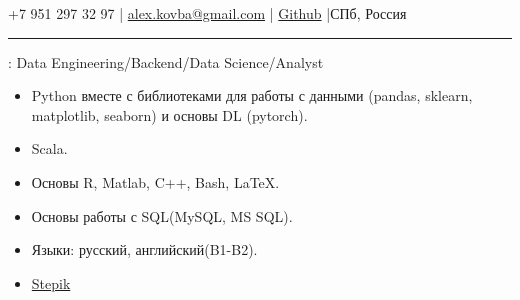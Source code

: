 \documentclass[11pt]{article}
\begin{document}

\vspace{0.5em}

\noindent +7 951 297 32 97    |   \href{mailto:alex.kovba@gmail.com}{alex.kovba@gmail.com}  | \href{https://github.com/AlexeyArcher}{Github} |СПб, Россия

\vspace{0.5em}

\hrule

\vspace{1.5em}


: Data Engineering/Backend/Data Science/Analyst


\vspace{1em}

\begin{itemize}

\item Python вместе с библиотеками для работы с данными (pandas, sklearn, matplotlib, seaborn) и основы DL (pytorch).
\item Scala.
\item Основы R, Matlab, C++, Bash, LaTeX.
\item Основы работы с SQL(MySQL, MS SQL).
\item Языки: русский, английский(B1-B2).
\end{itemize}


\begin{itemize}

\item  \href{https://stepik.org/users/21130374}{Stepik} 

\end{itemize}
\end{document}
